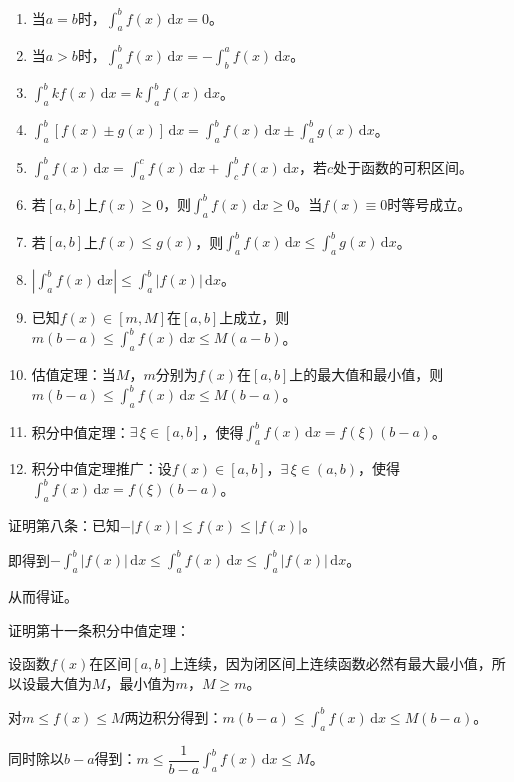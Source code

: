 \documentclass[UTF8, 12pt]{ctexart}
\begin{document}
\begin{enumerate}
    \item 当$a=b$时，$\int_a^bf(x)\,\textrm{d}x=0$。
    \item 当$a>b$时，$\int_a^bf(x)\,\textrm{d}x=-\int_b^af(x)\,\textrm{d}x$。
    \item $\int_a^bkf(x)\,\textrm{d}x=k\int_a^bf(x)\,\textrm{d}x$。
    \item $\int_a^b[f(x)\pm g(x)]\,\textrm{d}x=\int_a^bf(x)\,\textrm{d}x\pm\int_a^bg(x)\,\textrm{d}x$。
    \item $\int_a^bf(x)\,\textrm{d}x=\int_a^cf(x)\,\textrm{d}x+\int_c^bf(x)\,\textrm{d}x$，若$c$处于函数的可积区间。
    \item 若$[a,b]$上$f(x)\geqslant 0$，则$\int_a^bf(x)\,\textrm{d}x\geqslant 0$。当$f(x)\equiv0$时等号成立。
    \item 若$[a,b]$上$f(x)\leqslant g(x)$，则$\int_a^bf(x)\,\textrm{d}x\leqslant\int_a^bg(x)\,\textrm{d}x$。
    \item $\left\vert\int_a^bf(x)\,\textrm{d}x\right\vert\leqslant\int_a^b\vert f(x)\vert\,\textrm{d}x$。
    \item 已知$f(x)\in[m,M]$在$[a,b]$上成立，则$m(b-a)\leqslant\int_a^bf(x)\,\textrm{d}x\leqslant M(a-b)$。
    \item 估值定理：当$M$，$m$分别为$f(x)$在$[a,b]$上的最大值和最小值，则$m(b-a)\leqslant\int_a^bf(x)\,\textrm{d}x\leqslant M(b-a)$。
    \item 积分中值定理：$\exists\,\xi\in[a,b]$，使得$\int_a^bf(x)\,\textrm{d}x=f(\xi)(b-a)$。
    \item 积分中值定理推广：设$f(x)\in[a,b]$，$\exists\,\xi\in(a,b)$，使得$\int_a^bf(x)\,\textrm{d}x=f(\xi)(b-a)$。
\end{enumerate}

证明第八条：已知$-\vert f(x)\vert\leqslant f(x)\leqslant\vert f(x)\vert$。

即得到$-\int_a^b\vert f(x)\vert\,\textrm{d}x\leqslant\int_a^bf(x)\,\textrm{d}x\leqslant\int_a^b\vert f(x)\vert\,\textrm{d}x$。

从而得证。

证明第十一条积分中值定理：

设函数$f(x)$在区间$[a,b]$上连续，因为闭区间上连续函数必然有最大最小值，所以设最大值为$M$，最小值为$m$，$M\geqslant m$。

对$m\leqslant f(x)\leqslant M$两边积分得到：$m(b-a)\leqslant\int_a^bf(x)\,\textrm{d}x\leqslant M(b-a)$。

同时除以$b-a$得到：$m\leqslant\dfrac{1}{b-a}\int_a^bf(x)\,\textrm{d}x\leqslant M$。
\end{document}
